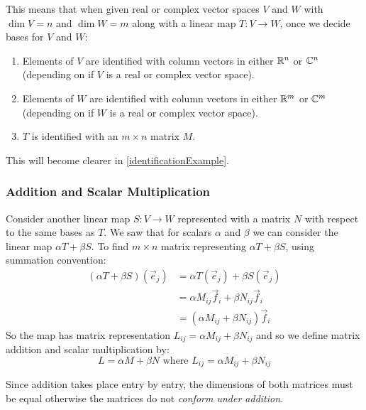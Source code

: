 \documentclass[../main.tex]{subfiles}
\begin{document}
This means that when given real or complex vector spaces $V$ and $W$ with $\dim V = n$ and $\dim W = m$ along with a linear map $T: V \to W$, once we decide bases for $V$ and $W$:
\begin{enumerate}
  \item Elements of $V$ are identified with column vectors in either $\mathbb{R}^{n}$ or $\mathbb{C}^{n}$ (depending on if $V$ is a real or complex vector space).
  \item Elements of $W$ are identified with column vectors in either $\mathbb{R}^{m}$ or $\mathbb{C}^{m}$ (depending on if $W$ is a real or complex vector space).
  \item $T$ is identified with an $m \times n$ matrix $M$.
\end{enumerate}
This will become clearer in \cref{identificationExample}.
\subsubsection{Addition and Scalar Multiplication}
Consider another linear map $S: V \to W$ represented with a matrix $N$ with respect to the same bases as $T$.
We saw that for scalars $\alpha$ and $\beta$ we can consider the linear map $\alpha T + \beta S$.
To find $m \times n$ matrix representing $\alpha T + \beta S$, using summation convention:
\begin{align*}
  (\alpha T + \beta S)(\vec{e}_j) &= \alpha T(\vec{e}_j) + \beta S(\vec{e}_j) \\
                                  &= \alpha M_{i j}\vec{f}_i + \beta N_{i j}\vec{f}_i \\
                                  &= (\alpha M_{i j} + \beta N_{i j})\vec{f}_i
\end{align*}
So the map has matrix representation $L_{i j} = \alpha M_{i j} + \beta N_{i j}$ and so we define matrix addition and scalar multiplication by:
\[
  L = \alpha M + \beta N \text{ where } L_{i j} = \alpha M_{i j} + \beta N_{i j}
\]
\begin{remark}
  Since addition takes place entry by entry, the dimensions of both matrices must be equal otherwise the matrices do not \textit{conform under addition}.
\end{remark}
\end{document}
